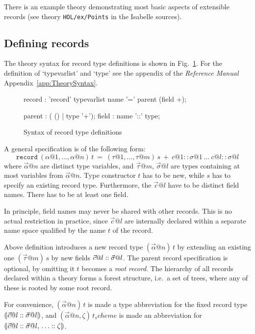 There is an example theory demonstrating most basic aspects of extensible
records (see theory \texttt{HOL/ex/Points} in the Isabelle sources).


\subsection{Defining records}\label{sec:HOL:record-def}

The theory syntax for record type definitions is shown in
Fig.~\ref{fig:HOL:record}.  For the definition of `typevarlist' and `type' see
{the appendix of the {\em Reference Manual\/}}%
{Appendix~\ref{app:TheorySyntax}}.

\begin{figure}[htbp]
\begin{rail}
record  : 'record' typevarlist name '=' parent (field +);

parent  : ( () | type '+');
field   : name '::' type;
\end{rail}
\caption{Syntax of record type definitions}
\label{fig:HOL:record}
\end{figure}

A general  specification is of the following form:
\[
\mathtt{record}~(\alpha@1, \dots, \alpha@n) \, t ~=~
  (\tau@1, \dots, \tau@m) \, s ~+~ c@1 :: \sigma@1 ~ \dots ~ c@l :: \sigma@l
\]
where $\vec\alpha@n$ are distinct type variables, and $\vec\tau@m$,
$\vec\sigma@l$ are types containing at most variables from $\vec\alpha@n$.
Type constructor $t$ has to be new, while $s$ has to specify an existing
record type.  Furthermore, the $\vec c@l$ have to be distinct field names.
There has to be at least one field.

In principle, field names may never be shared with other records.  This is no
actual restriction in practice, since $\vec c@l$ are internally declared
within a separate name space qualified by the name $t$ of the record.

\medskip

Above definition introduces a new record type $(\vec\alpha@n) \, t$ by
extending an existing one $(\vec\tau@m) \, s$ by new fields $\vec c@l \ty
\vec\sigma@l$.  The parent record specification is optional, by omitting it
$t$ becomes a \emph{root record}.  The hierarchy of all records declared
within a theory forms a forest structure, i.e.\ a set of trees, where any of
these is rooted by some root record.

For convenience, $(\vec\alpha@n) \, t$ is made a type abbreviation for the
fixed record type $\record{\vec c@l \ty \vec\sigma@l}$, and $(\vec\alpha@n,
\zeta) \, t_scheme$ is made an abbreviation for $\record{\vec c@l \ty
  \vec\sigma@l\fs \more \ty \zeta}$.

